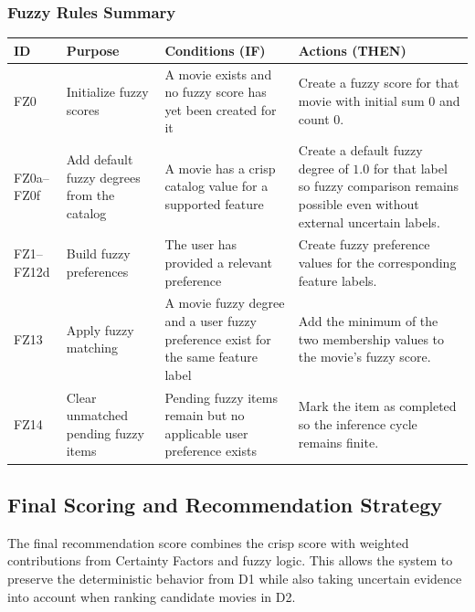 \documentclass[11pt]{article}
\begin{document}
\subsubsection{Fuzzy Rules Summary}
\begingroup
\small
\setlength{\tabcolsep}{4pt}
\renewcommand{\arraystretch}{1.08}
\begin{tabular}{@{}L{0.11\textwidth} L{0.27\textwidth} L{0.30\textwidth} L{0.27\textwidth}@{}}
\toprule
\textbf{ID} & \textbf{Purpose} & \textbf{Conditions (IF)} & \textbf{Actions (THEN)} \\
\midrule
FZ0 & Initialize fuzzy scores &
A movie exists and no fuzzy score has yet been created for it &
Create a fuzzy score for that movie with initial sum $0$ and count $0$. \\
FZ0a--FZ0f & Add default fuzzy degrees from the catalog &
A movie has a crisp catalog value for a supported feature &
Create a default fuzzy degree of $1.0$ for that label so fuzzy comparison remains possible even without external uncertain labels. \\
FZ1--FZ12d & Build fuzzy preferences &
The user has provided a relevant preference &
Create fuzzy preference values for the corresponding feature labels. \\
FZ13 & Apply fuzzy matching &
A movie fuzzy degree and a user fuzzy preference exist for the same feature label &
Add the minimum of the two membership values to the movie's fuzzy score. \\
FZ14 & Clear unmatched pending fuzzy items &
Pending fuzzy items remain but no applicable user preference exists &
Mark the item as completed so the inference cycle remains finite. \\
\bottomrule
\end{tabular}
\endgroup

\subsection{Final Scoring and Recommendation Strategy}
The final recommendation score combines the crisp score with weighted contributions from Certainty Factors and fuzzy logic. This allows the system to preserve the deterministic behavior from D1 while also taking uncertain evidence into account when ranking candidate movies in D2.
\end{document}
